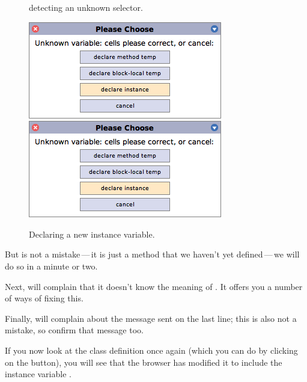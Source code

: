 \documentclass[a4paper,10pt,twoside]{book}
\begin{document}
\begin{figure}[htb]
\begin{minipage}{0.34\textwidth}
	\caption{\squeak detecting an unknown selector.\label{fig:unknownSelector}}
\end{minipage}
\hfill
\begin{minipage}{0.64\textwidth}
	\centering
	\ifluluelse
		{\includegraphics[width=\textwidth]{DeclareInstanceVar}}
		{\includegraphics[scale=0.7]{DeclareInstanceVar}}
	\caption{Declaring a new instance variable.\label{fig:declareInstance}}
\end{minipage}
\end{figure}

But  is not a mistake\,---\,it is just a method that we haven't yet defined\,---\,we will do so in a minute or two.


Next, \squeak will complain that it doesn't know the meaning of .
It offers you a number of ways of fixing this.

Finally, \squeak will complain about the message  sent on the last line; this is also not a mistake, so confirm that message too.

If you now look at the class definition once again (which you can do by clicking on the  button), you will see that the browser has modified it to include the instance variable .
\end{document}
